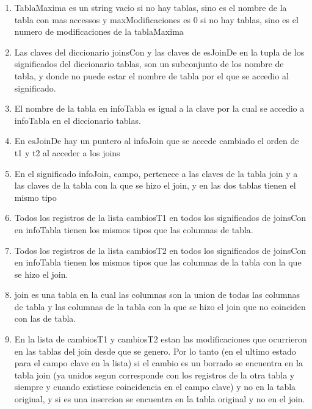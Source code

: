 \begin{enumerate}
	\item TablaMaxima es un string vacio si no hay tablas, sino es el nombre de la tabla con mas accessos y maxModificaciones es 0 si no hay tablas, sino es el numero de modificaciones de la tablaMaxima
	
	\item Las claves del diccionario joinsCon y las claves de esJoinDe en la tupla de los significados del diccionario tablas, son un subconjunto de los nombre de tabla, y donde no puede estar el nombre de tabla por el que se accedio al significado.
	
	\item El nombre de la tabla en infoTabla es igual a la clave por la cual se accedio a infoTabla en el diccionario tablas.
	
	\item En esJoinDe hay un puntero al infoJoin que se accede cambiado el orden de t1 y t2 al acceder a los joins
	
	\item En el significado infoJoin, campo, pertenece a las claves de la tabla join y a las claves de la tabla con la que se hizo el join, y en las dos tablas tienen el mismo tipo
	
	\item Todos los registros de la lista cambiosT1 en todos los significados de joinsCon en infoTabla tienen los mismos tipos que las columnas de tabla.

	\item Todos los registros de la lista cambiosT2 en todos los significados de joinsCon en infoTabla tienen los mismos tipos que las columnas de la tabla con la que se hizo el join.
		
		\item  join es una tabla en la cual las columnas son la union de todas las columnas de tabla y las columnas de la tabla con la que se hizo el join que no coinciden con las de tabla.
		
	\item En la lista de cambiosT1 y cambiosT2 estan las modificaciones que ocurrieron en las tablas del join desde que se genero. Por lo tanto (en el ultimo estado para el campo clave en la lista) si el cambio es un borrado se encuentra en la tabla join (ya unidos segun corresponde con los registros de la otra tabla y siempre y cuando existiese coincidencia en el campo clave) y no en la tabla original, y si es una insercion se encuentra en la tabla original y no en el join.
		
\end{enumerate}






